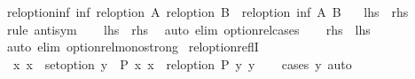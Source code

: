 \begin{isabellebody}
\endisatagproof
{\isafoldproof}%
%
\isadelimproof
%
\endisadelimproof
\isanewline
\isanewline
{}\isamarkupfalse%
\ rel{\isacharunderscore}{\kern0pt}option{\isacharunderscore}{\kern0pt}inf{\isacharcolon}{\kern0pt}\ {\isachardoublequoteopen}inf\ {\isacharparenleft}{\kern0pt}rel{\isacharunderscore}{\kern0pt}option\ A{\isacharparenright}{\kern0pt}\ {\isacharparenleft}{\kern0pt}rel{\isacharunderscore}{\kern0pt}option\ B{\isacharparenright}{\kern0pt}\ {\isacharequal}{\kern0pt}\ rel{\isacharunderscore}{\kern0pt}option\ {\isacharparenleft}{\kern0pt}inf\ A\ B{\isacharparenright}{\kern0pt}{\isachardoublequoteclose}\isanewline
\ \ {\isacharparenleft}{\kern0pt}\ {\isachardoublequoteopen}{\isacharquery}{\kern0pt}lhs\ {\isacharequal}{\kern0pt}\ {\isacharquery}{\kern0pt}rhs{\isachardoublequoteclose}{\isacharparenright}{\kern0pt}\isanewline
%
\isadelimproof
%
\endisadelimproof
%
\isatagproof
{}\isamarkupfalse%
\ {\isacharparenleft}{\kern0pt}rule\ antisym{\isacharparenright}{\kern0pt}\isanewline
\ \ \isamarkupfalse%
\ {\isachardoublequoteopen}{\isacharquery}{\kern0pt}lhs\ {\isasymle}\ {\isacharquery}{\kern0pt}rhs{\isachardoublequoteclose}\ \isamarkupfalse%
\ {\isacharparenleft}{\kern0pt}auto\ elim{\isacharcolon}{\kern0pt}\ option{\isachardot}{\kern0pt}rel{\isacharunderscore}{\kern0pt}cases{\isacharparenright}{\kern0pt}\isanewline
\ \ \isamarkupfalse%
\ {\isachardoublequoteopen}{\isacharquery}{\kern0pt}rhs\ {\isasymle}\ {\isacharquery}{\kern0pt}lhs{\isachardoublequoteclose}\ \isamarkupfalse%
\ {\isacharparenleft}{\kern0pt}auto\ elim{\isacharcolon}{\kern0pt}\ option{\isachardot}{\kern0pt}rel{\isacharunderscore}{\kern0pt}mono{\isacharunderscore}{\kern0pt}strong{\isacharparenright}{\kern0pt}\isanewline
{}\isamarkupfalse%
%
\endisatagproof
{\isafoldproof}%
%
\isadelimproof
\isanewline
%
\endisadelimproof
\isanewline
{}\isamarkupfalse%
\ rel{\isacharunderscore}{\kern0pt}option{\isacharunderscore}{\kern0pt}reflI{\isacharcolon}{\kern0pt}\isanewline
\ \ {\isachardoublequoteopen}{\isacharparenleft}{\kern0pt}{\isasymAnd}x{\isachardot}{\kern0pt}\ x\ {\isasymin}\ set{\isacharunderscore}{\kern0pt}option\ y\ {\isasymLongrightarrow}\ P\ x\ x{\isacharparenright}{\kern0pt}\ {\isasymLongrightarrow}\ rel{\isacharunderscore}{\kern0pt}option\ P\ y\ y{\isachardoublequoteclose}\isanewline
%
\isadelimproof
\ \ %
\endisadelimproof
%
\isatagproof
{}\isamarkupfalse%
\ {\isacharparenleft}{\kern0pt}cases\ y{\isacharparenright}{\kern0pt}\ auto%
\endisatagproof

\end{isabellebody}
